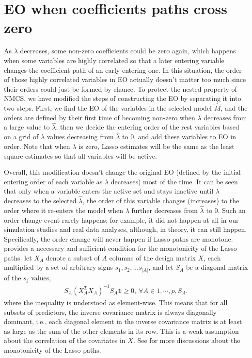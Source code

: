 \documentclass[10pt]{book}
\theoremstyle{definition}
\begin{document}
\section{EO when coefficients paths cross zero}
As $\lambda$ decreases, some non-zero coefficients could be zero again, which happens when some variables are highly correlated so that a later entering variable changes the coefficient path of an early entering one. In this situation, the order of those highly correlated variables in EO actually doesn't matter too much since their orders could just be formed by chance. To protect the nested property of NMCS, we have modified the steps of constructing the EO by separating it into two steps. First, we find the EO of the variables in the selected model $\hat{M}$, and the orders are defined by their first time of becoming non-zero when $\lambda$ decreases from a large value to $\hat{\lambda}$; then we decide the entering order of the rest variables based on a grid of $\lambda$ values decreasing from $\hat{\lambda}$ to 0, and add these variables to EO in order. Note that when $\lambda$ is zero, Lasso estimates will be the same as the least square estimates so that all variables will be active.

Overall, this modification doesn't change the original EO (defined by the initial entering order of each variable as $\lambda$ decreases) most of the time. It can be seen that only when a variable enters the active set and stays inactive until $\lambda$ decreases to the selected $\hat{\lambda}$, the order of this variable changes (increases) to the order where it re-enters the model when $\lambda$ further decreases from $\hat{\lambda}$ to $0$. Such an order change event rarely happens; for example, it did not happen at all in our simulation studies and real data analyses, although, in theory, it can still happen. Specifically, the order change will never happen if Lasso paths are monotone. \citet{efron2004} provides a necessary and sufficient condition for the monotonicity of the Lasso paths: let $X_A$ denote a subset of $A$ columns of the design matrix $X$, each multiplied by a set of arbitrary signs $s_1, s_2, . . . s_{|A|}$, and let $S_A$ be a diagonal matrix of the $s_j$ values,
\begin{eqnarray}
S_A(X_A^TX_A)^{-1}S_A\mathbf{1} \geq 0, \ \forall A \in {1,\cdots, p}, S_A.
\end{eqnarray}
where the inequality is understood as element-wise. This means that for all subsets of predictors, the inverse covariance matrix is always diagonally dominant, i.e., each diagonal element in the inverse covariance matrix is at least as large as the sum of the other elements in its row. This is a weak assumption about the correlation of the covariates in $X$. See \citet{hastie2007} for more discussions about the monotonicity of the Lasso paths. 
\end{document}
